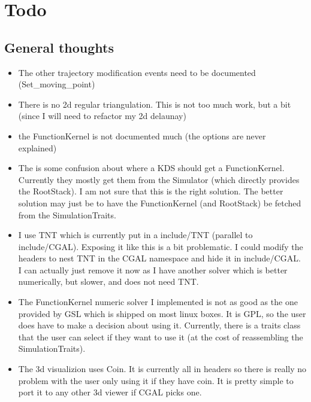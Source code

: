 \section{Todo}

\subsection{General thoughts}

\begin{itemize}


\item The other trajectory modification events need to be documented
  (Set\_moving\_point)

\item There is no 2d regular triangulation. This is not too much work,
  but a bit (since I will need to refactor my 2d delaunay)

\item the FunctionKernel is not documented much (the options are never
  explained)

\item The is some confusion about where a KDS should get a
  FunctionKernel. Currently they mostly get them from the Simulator
  (which directly provides the RootStack). I am not sure that this is
  the right solution. The better solution may just be to have the
  FunctionKernel (and RootStack) be fetched from the SimulationTraits.

\item I use TNT which is currently put in a include/TNT (parallel to
  include/CGAL). Exposing it like this is a bit problematic. I could
  modify the headers to nest TNT in the CGAL namespace and hide it in
  include/CGAL. I can actually just remove it now as I have another
  solver which is better numerically, but slower, and does not need
  TNT.

\item The FunctionKernel numeric solver I implemented is not as good
  as the one provided by GSL which is shipped on most linux boxes. It
  is GPL, so the user does have to make a decision about using it.
  Currently, there is a traits class that the user can select if they
  want to use it (at the cost of reassembling the SimulationTraits).

\item The 3d visualizion uses Coin. It is currently all in headers so
  there is really no problem with the user only using it if they have
  coin. It is pretty simple to port it to any other 3d viewer if CGAL
  picks one.


\end{itemize}
